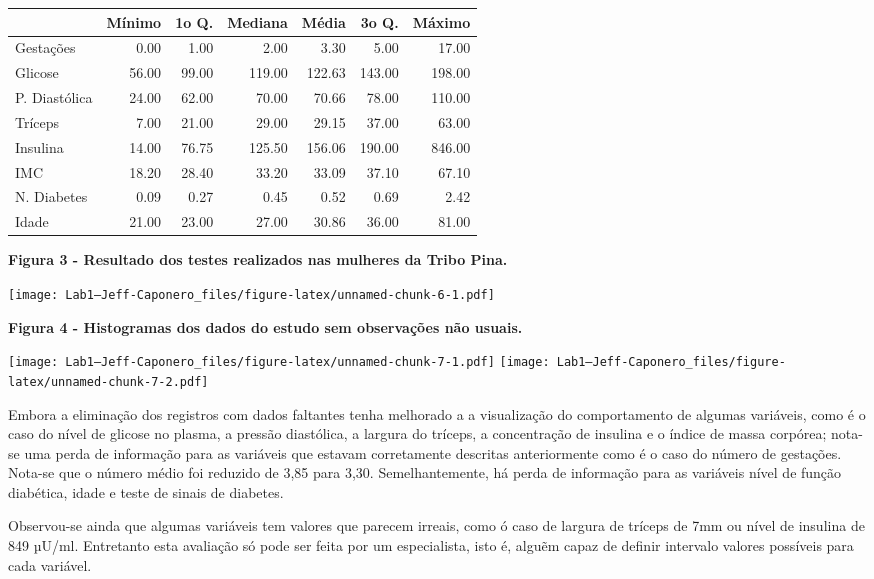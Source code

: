 \documentclass[
]{article}
\begin{document}
\begin{longtable}[]{@{}lrrrrrr@{}}
\toprule()
& Mínimo & 1o Q. & Mediana & Média & 3o Q. & Máximo \\
\midrule()
\endhead
Gestações & 0.00 & 1.00 & 2.00 & 3.30 & 5.00 & 17.00 \\
Glicose & 56.00 & 99.00 & 119.00 & 122.63 & 143.00 & 198.00 \\
P. Diastólica & 24.00 & 62.00 & 70.00 & 70.66 & 78.00 & 110.00 \\
Tríceps & 7.00 & 21.00 & 29.00 & 29.15 & 37.00 & 63.00 \\
Insulina & 14.00 & 76.75 & 125.50 & 156.06 & 190.00 & 846.00 \\
IMC & 18.20 & 28.40 & 33.20 & 33.09 & 37.10 & 67.10 \\
N. Diabetes & 0.09 & 0.27 & 0.45 & 0.52 & 0.69 & 2.42 \\
Idade & 21.00 & 23.00 & 27.00 & 30.86 & 36.00 & 81.00 \\
\bottomrule()
\end{longtable}

\newpage

\textbf{Figura 3 - Resultado dos testes realizados nas mulheres da Tribo
Pina.}

\texttt{[image: Lab1---Jeff-Caponero\_files/figure-latex/unnamed-chunk-6-1.pdf]}

\newline

\textbf{Figura 4 - Histogramas dos dados do estudo sem observações não
usuais.}

\texttt{[image: Lab1---Jeff-Caponero\_files/figure-latex/unnamed-chunk-7-1.pdf]}
\texttt{[image: Lab1---Jeff-Caponero\_files/figure-latex/unnamed-chunk-7-2.pdf]}

\newline
\newline

Embora a eliminação dos registros com dados faltantes tenha melhorado a
a visualização do comportamento de algumas variáveis, como é o caso do
nível de glicose no plasma, a pressão diastólica, a largura do tríceps,
a concentração de insulina e o índice de massa corpórea; nota-se uma
perda de informação para as variáveis que estavam corretamente descritas
anteriormente como é o caso do número de gestações. Nota-se que o número
médio foi reduzido de 3,85 para 3,30. Semelhantemente, há perda de
informação para as variáveis nível de função diabética, idade e teste de
sinais de diabetes.

Observou-se ainda que algumas variáveis tem valores que parecem irreais,
como ó caso de largura de tríceps de 7mm ou nível de insulina de 849
µU/ml. Entretanto esta avaliação só pode ser feita por um especialista,
isto é, alguẽm capaz de definir intervalo valores possíveis para cada
variável.
\end{document}
